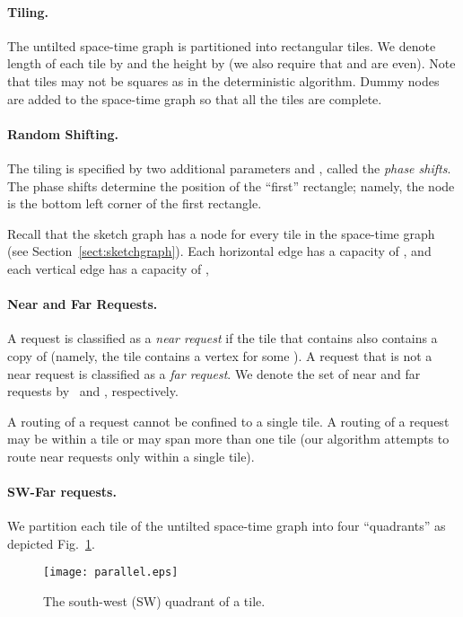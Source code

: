 \documentclass[11pt]{article}
\newenvironment{proof sketch}[1]{\noindent {\emph{Proof sketch of #1:}}}{\hfill \qed}
\newcommand{\far}{\text{\emph{Far}}}
\newcommand{\near}{\text{\emph{Near}}}
\begin{document}
\paragraph{Tiling.}
The untilted space-time graph  is partitioned into rectangular
tiles.  We denote length of each tile by  and the height by 
(we also require that  and  are even).  Note that tiles may
not be squares as in the deterministic algorithm.  Dummy nodes are
added to the space-time graph  so that all the tiles are
complete.

\paragraph{Random Shifting.}
The tiling is specified by two additional parameters  and , called the \emph{phase shifts}.  The phase shifts determine the position of the ``first'' rectangle; namely, the node  is the bottom left corner of the first rectangle.

\medskip\noindent
Recall that the sketch graph has a node for every tile in the space-time graph (see
Section~\ref{sect:sketchgraph}).
Each horizontal edge has a capacity of , and
each vertical edge has a capacity of ,

\paragraph{Near and Far Requests.}
A request  is classified as a \emph{near request} if the tile that
contains  also contains a copy of  (namely, the tile contains a
vertex  for some ). A request that is not a near request is classified
as a \emph{far request}. We denote the set of near and far requests by \near\ and
\far, respectively.

A routing of a request  cannot be confined to a single tile. A
routing of a request  may be within a tile or may span more than one
tile (our algorithm attempts to route near requests only within a single tile).

\paragraph{SW-Far requests.}
We partition each tile of the untilted space-time graph into four ``quadrants'' as depicted
Fig.~\ref{fig:quad}.
\begin{figure}[h]
  \centering
    \texttt{[image: parallel.eps]}
  \caption{The south-west (SW) quadrant of a tile.}
\label{fig:quad}
\end{figure}
\end{document}
